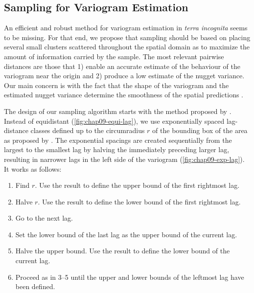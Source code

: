 \subsection{Sampling for Variogram Estimation}
\label{sec:chap09-ppl}

An efficient and robust method for variogram estimation in \emph{terra incognita} seems to be missing. For 
that end, we propose that sampling should be based on placing several small clusters scattered throughout the 
spatial domain as to maximize the amount of information carried by the sample. The most relevant pairwise 
distances are those that 1) enable an accurate estimate of the behaviour of the variogram near the origin and 
2) produce a low estimate of the nugget variance. Our main concern is with the fact that the shape of the 
variogram and the estimated nugget variance determine the smoothness of the spatial predictions 
\cite{WebsterEtAl2007}.

The design of our sampling algorithm starts with the method proposed by \citet{WarrickEtAl1987}. Instead of 
equidistant (\autoref{fig:chap09-equi-lag}), we use exponentially spaced lag-distance classes defined up to 
the circumradius $r$ of the bounding box of the area as proposed by \citet{TruongEtAl2013}. The exponential 
spacings are created sequentially from the largest to the smallest lag by halving the immediately preceding 
larger lag, resulting in narrower lags in the left side of the variogram (\autoref{fig:chap09-exp-lag}). It 
works as follows:

\begin{enumerate}
 \item Find $r$. Use the result to define the upper bound of the first rightmost lag.
 \item Halve $r$. Use the result to define the lower bound of the first rightmost lag.
 \item Go to the next lag.
 \item Set the lower bound of the last lag as the upper bound of the current lag.
 \item Halve the upper bound. Use the result to define the lower bound of the current lag.
 \item Proceed as in 3--5 until the upper and lower bounds of the leftmost lag have been defined.
\end{enumerate}

